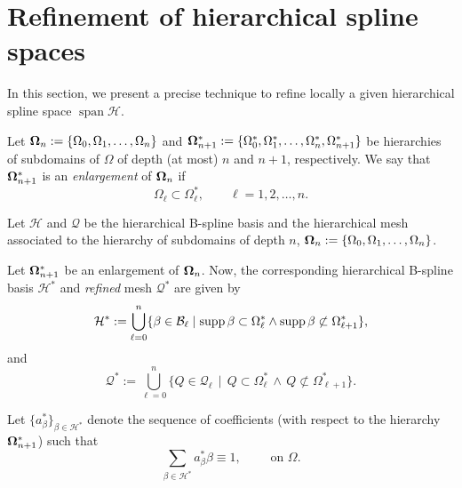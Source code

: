 \documentclass[a4paper]{siamltex1213}
\DeclareMathOperator{\Span}{span}
\newcommand\BB{\mathcal B}
\newcommand\QQ{\mathcal Q}
\newcommand\HH{\mathcal H}
\begin{document}
\section{Refinement of hierarchical spline spaces}\label{S:refinement}

In this section, we present a precise technique to refine locally a given hierarchical spline space $\Span\HH$.


\begin{definition}
 Let ${\bf\Omega}_n := \{\Omega_0,\Omega_1,\dots,\Omega_n\}$ and ${\bf\Omega}_{n+1}^*:= \{\Omega_0^*,\Omega_1^*,\dots,\Omega_n^*,\Omega_{n+1}^*\}$ be hierarchies of subdomains of $\Omega$ of depth (at most) $n$ and $n+1$, respectively. We say that ${\bf\Omega}_{n+1}^*$ is an \emph{enlargement} of ${\bf\Omega}_n$ if
 $$\Omega_\ell\subset\Omega_\ell^*,\qquad \ell=1,2,\dots,n.$$ 
 \end{definition}

 Let $\HH$ and $\QQ$ be the hierarchical B-spline basis and the hierarchical mesh associated to the hierarchy of 
subdomains of depth $n$,
${\bf\Omega}_n := \{\Omega_0,\Omega_1,\dots,\Omega_n\}$.
 
Let ${\bf\Omega}_{n+1}^*$ be an enlargement of ${\bf\Omega}_n$. Now, the corresponding hierarchical B-spline basis ${\HH}^*$ and 
\emph{refined} 
mesh $\QQ^*$ are given by 
\begin{equation}
{\HH}^*:= \bigcup_{\ell = 0}^{n} \{\beta \in \BB_\ell \mid \supp \beta 
\subset \Omega_\ell^* \wedge  \supp \beta \not\subset \Omega_{\ell+1}^*\},
\end{equation}
and
$$\QQ^*:= \bigcup_{\ell = 0}^{n} \{ Q\in\QQ_\ell \,\mid\, Q\subset \Omega_\ell^* 
\,\wedge\, Q\not\subset \Omega_{\ell+1}^*\}.$$



Let $\{a_\beta^*\}_{\beta\in{\HH}^*}$ denote the sequence of coefficients (with respect to the hierarchy ${\bf\Omega}_{n+1}^*$) such that $$\sum_{\beta\in{\HH}^*} a_\beta^*\beta \equiv 1,\qquad\text{ on }\Omega.$$ 
\end{document}
